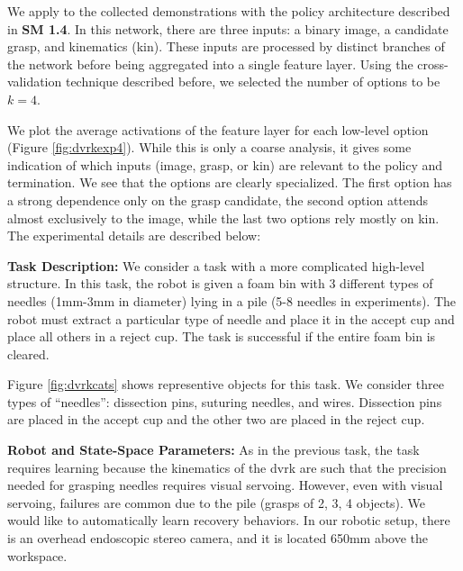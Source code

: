 We apply \alg to the collected demonstrations with the policy architecture described in \textbf{SM 1.4}. In this network, there are three inputs: a binary \textsf{image}, a candidate \textsf{grasp}, and kinematics (\textsf{kin}). These inputs are processed by distinct branches of the network before being aggregated into a single feature layer.  Using the cross-validation technique described before, we selected the number of options to be $k=4$.

We plot the average activations of the feature layer for each low-level option (Figure \ref{fig:dvrkexp4}). While this is only a coarse analysis, it gives some indication of which inputs (\textsf{image}, \textsf{grasp}, or \textsf{kin}) are relevant to the policy and termination. We see that the options are clearly specialized. The first option has a strong dependence only on the \textsf{grasp} candidate, the second option attends almost exclusively to the \textsf{image}, while the last two options rely mostly on \textsf{kin}.
The experimental details are described below:

\vspace{0.5em} \noindent \textbf{Task Description: } We consider a task with a more complicated high-level structure.
In this task, the robot is given a foam bin with 3 different types of needles (1mm-3mm in diameter) lying in a pile (5-8 needles in experiments).
The robot must extract a particular type of needle  and place it in the accept cup and place all others in a reject cup.
The task is successful if the entire foam bin is cleared.

Figure \ref{fig:dvrkcats} shows representive objects for this task. We consider three types of ``needles'': dissection pins, suturing needles, and wires.
Dissection pins are placed in the accept cup and the other two are placed in the reject cup.


\vspace{0.5em} \noindent \textbf{Robot and State-Space Parameters: } As in the previous task, the task requires learning because the kinematics of the dvrk are such that the precision needed for grasping needles requires visual servoing.
However, even with visual servoing, failures are common due to the pile (grasps of 2, 3, 4 objects).
We would like to automatically learn recovery behaviors. 
In our robotic setup, there is an overhead endoscopic stereo camera, and it is located 650mm above the workspace.


